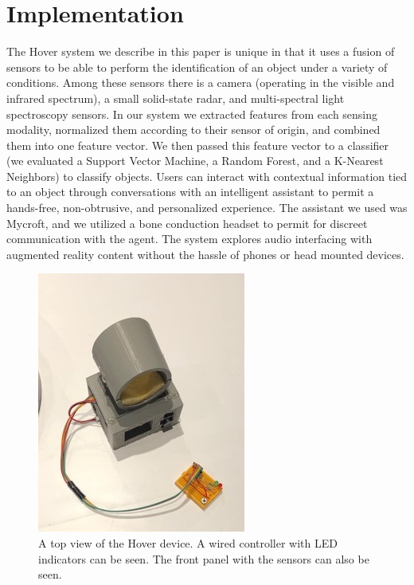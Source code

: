 \section{Implementation}
The Hover system we describe in this paper is unique in that it uses a fusion of sensors to be able to perform the identification of an object under a variety of conditions. Among these sensors there is a camera (operating in the visible and infrared spectrum), a small solid-state radar, and multi-spectral light spectroscopy sensors. In our system we extracted features from each sensing modality, normalized them according to their sensor of origin, and combined them into one feature vector.  We then passed this feature vector to a classifier (we evaluated a Support Vector Machine, a Random Forest, and a K-Nearest Neighbors) to classify objects. Users can interact with contextual information tied to an object through conversations with an intelligent assistant to permit a hands-free, non-obtrusive, and personalized experience.  The assistant we used was Mycroft, and we utilized a bone conduction headset to permit for discreet communication with the agent. The system explores audio interfacing with augmented reality content without the hassle of phones or head mounted devices. 
\begin{figure}
\includegraphics{hovertopview}
\caption{A top view of the Hover device. A wired controller with LED indicators can be seen.  The front panel with the sensors can also be seen.}
\end{figure}

